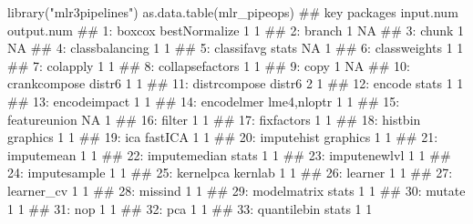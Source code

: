 \documentclass[
  11pt,
  parskip=half,
  DIV=calc,
  BCOR=10mm,
  x11names]{scrbook}
\newenvironment{Shaded}{}{}
\newcommand{\KeywordTok}[1]{\textcolor[rgb]{0.00,0.00,1.00}{#1}}
\newcommand{\NormalTok}[1]{#1}
\newcommand{\StringTok}[1]{\textcolor[rgb]{0.00,0.50,0.50}{#1}}
\begin{document}
\begin{Shaded}
\begin{Highlighting}[]
\KeywordTok{library}\NormalTok{(}\StringTok{"mlr3pipelines"}\NormalTok{)}
\KeywordTok{as.data.table}\NormalTok{(mlr_pipeops)}
\NormalTok{##                 key      packages input.num output.num}
\NormalTok{##  1:          boxcox bestNormalize         1          1}
\NormalTok{##  2:          branch                       1         NA}
\NormalTok{##  3:           chunk                       1         NA}
\NormalTok{##  4:  classbalancing                       1          1}
\NormalTok{##  5:      classifavg         stats        NA          1}
\NormalTok{##  6:    classweights                       1          1}
\NormalTok{##  7:        colapply                       1          1}
\NormalTok{##  8: collapsefactors                       1          1}
\NormalTok{##  9:            copy                       1         NA}
\NormalTok{## 10:    crankcompose        distr6         1          1}
\NormalTok{## 11:    distrcompose        distr6         2          1}
\NormalTok{## 12:          encode         stats         1          1}
\NormalTok{## 13:    encodeimpact                       1          1}
\NormalTok{## 14:      encodelmer   lme4,nloptr         1          1}
\NormalTok{## 15:    featureunion                      NA          1}
\NormalTok{## 16:          filter                       1          1}
\NormalTok{## 17:      fixfactors                       1          1}
\NormalTok{## 18:         histbin      graphics         1          1}
\NormalTok{## 19:             ica       fastICA         1          1}
\NormalTok{## 20:      imputehist      graphics         1          1}
\NormalTok{## 21:      imputemean                       1          1}
\NormalTok{## 22:    imputemedian         stats         1          1}
\NormalTok{## 23:    imputenewlvl                       1          1}
\NormalTok{## 24:    imputesample                       1          1}
\NormalTok{## 25:       kernelpca       kernlab         1          1}
\NormalTok{## 26:         learner                       1          1}
\NormalTok{## 27:      learner_cv                       1          1}
\NormalTok{## 28:         missind                       1          1}
\NormalTok{## 29:     modelmatrix         stats         1          1}
\NormalTok{## 30:          mutate                       1          1}
\NormalTok{## 31:             nop                       1          1}
\NormalTok{## 32:             pca                       1          1}
\NormalTok{## 33:     quantilebin         stats         1          1}

\end{Highlighting}
\end{Shaded}
\end{document}
